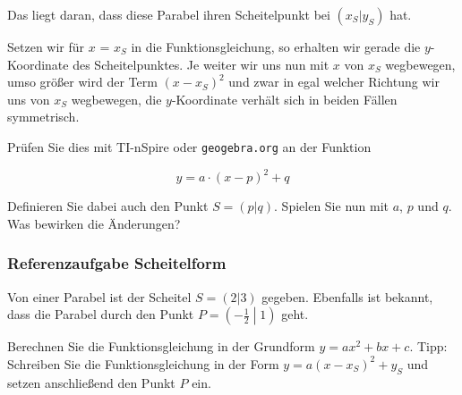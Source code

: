 Das liegt daran, dass diese Parabel ihren Scheitelpunkt bei
$(x_S|y_S)$ hat.

Setzen wir für $x$ = $x_S$ in die Funktionsgleichung, so erhalten wir
gerade die $y$-Koordinate des Scheitelpunktes. Je weiter wir uns nun
mit $x$ von $x_S$ wegbewegen, umso größer wird der Term $(x-x_S)^2$
und zwar in egal welcher Richtung wir uns von $x_S$ wegbewegen, die
$y$-Koordinate verhält sich in beiden Fällen symmetrisch.

Prüfen Sie dies mit TI-nSpire oder \texttt{geogebra.org} an der Funktion

$$y = a\cdot{}(x-p)^2 + q$$

Definieren Sie dabei auch den Punkt $S=(p|q)$. Spielen Sie nun mit
$a$, $p$ und $q$. Was bewirken die Änderungen?
\newpage


\subsubsection{Referenzaufgabe Scheitelform}
Von einer Parabel ist der Scheitel $S=(2|3)$ gegeben. Ebenfalls ist bekannt, dass die Parabel durch den Punkt $P=\left(-\frac{1}{2}\middle|1\right)$ geht.

  Berechnen Sie die Funktionsgleichung in der Grundform $y = ax^2 + bx + c$. Tipp:
  Schreiben Sie die Funktionsgleichung in der Form $y=a(x - x_S)^2 +  y_S$ und setzen anschließend den Punkt $P$ ein.


  
